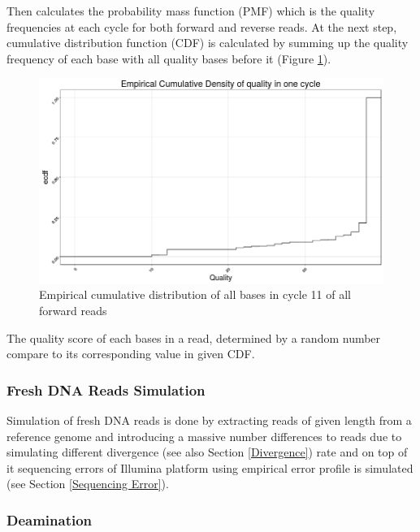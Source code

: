 \documentclass[11pt,a4paper]{report}
\begin{document}
Then calculates the probability mass function (PMF) which is the quality 
frequencies at each cycle for both forward and reverse reads. At the next 
step, cumulative distribution function (CDF) is calculated by summing up the 
quality frequency of each base with all quality bases before it (Figure \ref{CDF}).

\begin{figure}[H]
\centering
\includegraphics[width=12cm]{pictures/Rplot_ecdf.png}
\caption{Empirical cumulative distribution of all bases in cycle 11 of all forward 
reads}
\label{CDF}
\end{figure}

The quality score of each bases in a read, determined by a random number compare to 
its corresponding value in given CDF.


\subsubsection{Fresh DNA Reads Simulation} \label{Fresh DNA Reads Simulation}


Simulation of fresh DNA reads is done by extracting reads of given length from a 
reference genome and introducing a massive number differences to reads due to 
simulating different divergence (see also Section \ref{Divergence}) rate and on 
top of it sequencing errors of Illumina platform using empirical error profile 
is simulated (see Section \ref{Sequencing Error}).





\subsubsection{Deamination} \label{Deamination}
\end{document}
